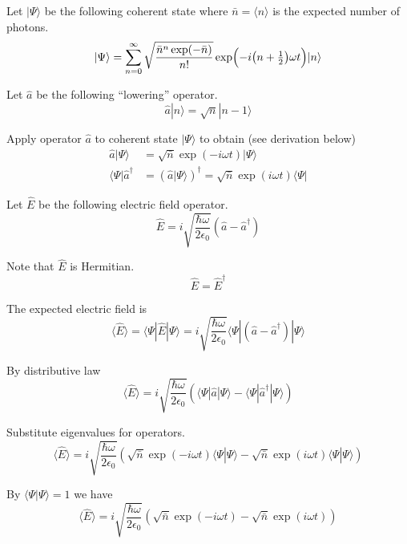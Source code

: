 \documentclass[12pt]{article}
\begin{document}
Let $|\Psi\rangle$ be the following coherent state where $\bar n=\langle n\rangle$ is the expected number of photons.
\begin{equation*}
|\Psi\rangle=\sum_{n=0}^\infty
\sqrt{\frac{\bar n^n\exp(-\bar n)}{n!}}
\exp\Bigl(-i\bigl(n+\tfrac{1}{2}\bigr)\omega t\Bigr)
|n\rangle
\end{equation*}

Let $\hat a$ be the following ``lowering'' operator.
\begin{equation*}
\hat a|n\rangle=\sqrt n|n-1\rangle
\end{equation*}

Apply operator $\hat a$ to coherent state $|\Psi\rangle$ to obtain (see derivation below)
\begin{align*}
\hat a|\Psi\rangle&=\sqrt{\bar n}\exp(-i\omega t)|\Psi\rangle
\\
\langle\Psi|\hat a^\dag&=\left(\hat a|\Psi\rangle\right)^\dag=\sqrt{\bar n}\exp(i\omega t)\langle\Psi|
\end{align*}

Let $\hat E$ be the following electric field operator.
\begin{equation*}
\hat E=i\sqrt{\frac{\hbar\omega}{2\epsilon_0}}
(\hat a-\hat a^\dag)
\end{equation*}

Note that $\hat E$ is Hermitian.
\begin{equation*}
\hat E=\hat E^\dag
\end{equation*}

The expected electric field is
\begin{equation*}
\langle\hat E\rangle
=\langle\Psi|\hat E|\Psi\rangle
=i\sqrt{\frac{\hbar\omega}{2\epsilon_0}}
\langle\Psi|(\hat a-\hat a^\dag)|\Psi\rangle
\end{equation*}

By distributive law
\begin{equation*}
\langle\hat E\rangle
=i\sqrt{\frac{\hbar\omega}{2\epsilon_0}}
\left(\langle\Psi|\hat a|\Psi\rangle-\langle\Psi|\hat a^\dag|\Psi\rangle\right)
\end{equation*}

Substitute eigenvalues for operators.
\begin{equation*}
\langle\hat E\rangle
=i\sqrt{\frac{\hbar\omega}{2\epsilon_0}}
\left(\sqrt{\bar n}\exp(-i\omega t)\langle\Psi|\Psi\rangle-\sqrt{\bar n}\exp(i\omega t)\langle\Psi|\Psi\rangle\right)
\end{equation*}

By $\langle\Psi|\Psi\rangle=1$ we have
\begin{equation*}
\langle\hat E\rangle
=i\sqrt{\frac{\hbar\omega}{2\epsilon_0}}
\left(\sqrt{\bar n}\exp(-i\omega t)-\sqrt{\bar n}\exp(i\omega t)\right)
\end{equation*}
\end{document}
